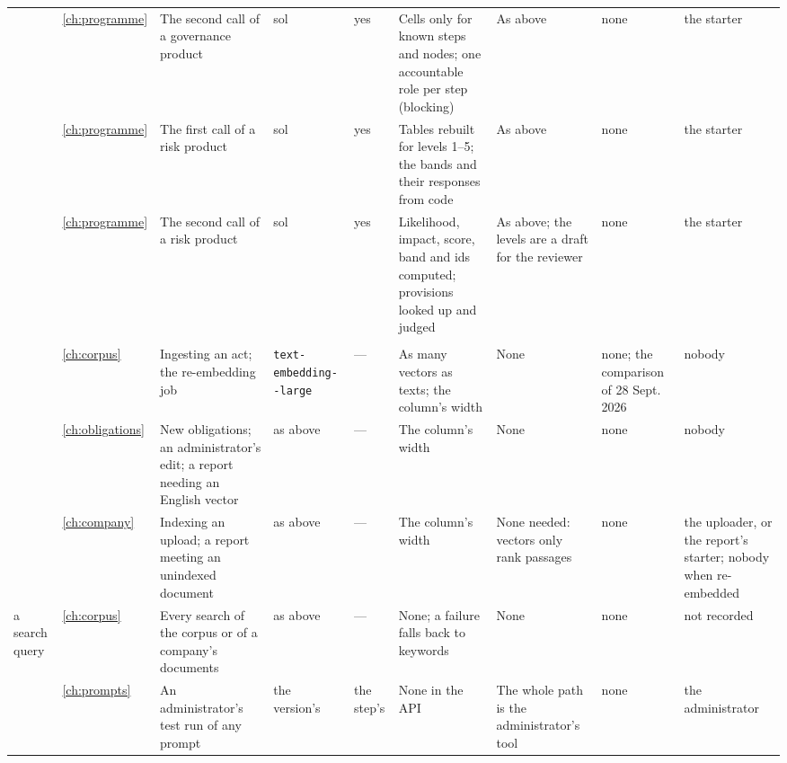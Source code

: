 \begin{landscape}
\begin{xltabular}{\linewidth}{@{}>{\scriptsize}L{31mm}>{\scriptsize}L{6mm}>{\scriptsize}L{36mm}>{\scriptsize}L{15mm}>{\scriptsize}L{9mm}>{\scriptsize}Y>{\scriptsize}L{38mm}>{\scriptsize}L{19mm}>{\scriptsize}L{25mm}@{}}
 & \ref{ch:programme} & The second call of a governance product & sol & yes & Cells only for known steps and nodes; one accountable role per step (blocking) & As above & none & the starter \\
 & \ref{ch:programme} & The first call of a risk product & sol & yes & Tables rebuilt for levels 1--5; the bands and their responses from code & As above & none & the starter \\
 & \ref{ch:programme} & The second call of a risk product & sol & yes & Likelihood, impact, score, band and ids computed; provisions looked up and judged & As above; the levels are a draft for the reviewer & none & the starter \\
\midrule
{} \\
 & \ref{ch:corpus} & Ingesting an act; the re-embedding job & \texttt{text-\allowbreak embedding--large} & --- & As many vectors as texts; the column's width & None & none; the comparison of 28 Sept. 2026 & nobody \\
 & \ref{ch:obligations} & New obligations; an administrator's edit; a report needing an English vector & as above & --- & The column's width & None & none & nobody \\
 & \ref{ch:company} & Indexing an upload; a report meeting an unindexed document & as above & --- & The column's width & None needed: vectors only rank passages & none & the uploader, or the report's starter; nobody when re-embedded \\
a search query & \ref{ch:corpus} & Every search of the corpus or of a company's documents & as above & --- & None; a failure falls back to keywords & None & none & not recorded \\
 & \ref{ch:prompts} & An administrator's test run of any prompt & the version's & the step's & None in the API & The whole path is the administrator's tool & none & the administrator \\
\end{xltabular}
\end{landscape}

